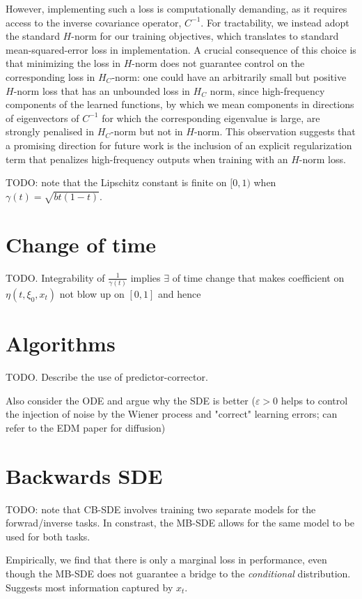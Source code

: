 However, implementing such a loss is computationally demanding, as it requires access to the inverse covariance operator, \(C^{-1}\). For tractability, we instead adopt the standard \(H\)-norm for our training objectives, which translates to standard mean-squared-error loss in implementation. A crucial consequence of this choice is that minimizing the loss in \(H\)-norm does not guarantee control on the corresponding loss in \(H_{C}\)-norm: one could have an arbitrarily small but positive \(H\)-norm loss that has an unbounded loss in \(H_{C}\) norm, since  high-frequency components of the learned functions, by which we mean components in directions of eigenvectors of \(C^{-1}\) for which the corresponding eigenvalue is large, are strongly penalised in \(H_{C}\)-norm  but not in \(H\)-norm. This observation suggests that a promising direction for future work is the inclusion of an explicit regularization term that penalizes high-frequency outputs when training with an \(H\)-norm loss.

TODO: note that the Lipschitz constant is finite on \([0,1)\) when \(\gamma(t) = \sqrt{bt(1-t)}\).

\section{Change of time}
TODO. Integrability of \(\frac{1}{\gamma(t)}\) implies \(\exists \) of time change that makes coefficient on \(\eta(t, \xi_{0}, x_{t})\) not blow up on \([0, 1]\) and hence

\section{Algorithms}
TODO. Describe the use of predictor-corrector.

Also consider the ODE and argue why the SDE is better (\(\varepsilon > 0\) helps to control the injection of noise by the Wiener process and "correct" learning errors; can refer to the EDM paper for diffusion)

\section{Backwards SDE}
TODO: note that CB-SDE involves training two separate models for the forwrad/inverse tasks. In constrast, the MB-SDE allows for the same model to be used for both tasks.

Empirically, we find that there is only a marginal loss in performance, even though the MB-SDE does not guarantee a bridge to the \textit{conditional} distribution. Suggests most information captured by \(x_{t}\).